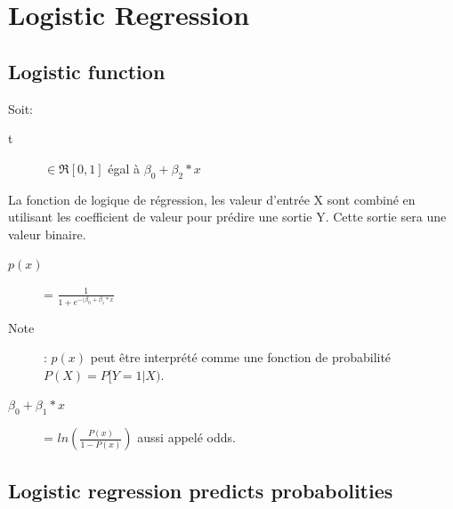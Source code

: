 \section{Logistic Regression}
\subsection{Logistic function}

Soit:
\begin{description}
\item[t] $\in \Re[0,1]$ égal à $\beta_0 + \beta_2 * x$
\end{description}

La fonction de logique de régression, les valeur d'entrée X sont combiné en utilisant les coefficient de valeur pour prédire une sortie Y. Cette sortie sera une valeur binaire.

\begin{description}
\item[$p(x)$] = $ \frac{1}{1 + e^{-(\beta_0 + \beta_1 * x}}$
\item[Note]: $p(x)$ peut être interprété comme une fonction de probabilité $P(X) = P[Y=1 | X)$.
\item[$\beta_0 + \beta_1 * x$] = $ ln(\frac{P(x)}{1 - P(x)})$ aussi appelé odds.
\end{description}

\subsection{Logistic regression predicts probabolities}


\pagebreak